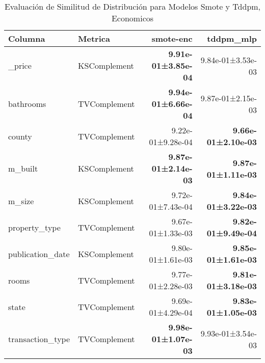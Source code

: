 \begin{table}[H]
\centering
\caption{Evaluación de Similitud de Distribución para Modelos Smote y Tddpm, Economicos}
\label{table-shape-economicos-b}
\begin{tabular}{|l|l|r|r|}
\hline
\rowcolor[gray]{0.8}
Columna & Metrica & smote-enc & tddpm\_mlp \\
\hline \_price & KSComplement & \bfseries 9.91e-01±3.85e-04 & 9.84e-01±3.53e-03 \\
\hline bathrooms & TVComplement & \bfseries 9.94e-01±6.66e-04 & 9.87e-01±2.15e-03 \\
\hline county & TVComplement & \cellcolor[rgb]{0.9, 0.54, 0.52} 9.22e-01±9.28e-04 & \bfseries \cellcolor[rgb]{0.9, 0.54, 0.52} 9.66e-01±2.10e-03 \\
\hline m\_built & KSComplement & \bfseries 9.87e-01±2.14e-03 & \bfseries 9.87e-01±1.11e-03 \\
\hline m\_size & KSComplement & 9.72e-01±7.43e-04 & \bfseries 9.84e-01±3.22e-03 \\
\hline property\_type & TVComplement & 9.67e-01±1.33e-03 & \bfseries 9.82e-01±9.49e-04 \\
\hline publication\_date & KSComplement & 9.80e-01±1.61e-03 & \bfseries 9.85e-01±1.61e-03 \\
\hline rooms & TVComplement & 9.77e-01±2.28e-03 & \bfseries 9.81e-01±3.18e-03 \\
\hline state & TVComplement & 9.69e-01±4.29e-04 & \bfseries 9.83e-01±1.05e-03 \\
\hline transaction\_type & TVComplement & \bfseries 9.98e-01±1.07e-03 & 9.93e-01±3.54e-03 \\
\hline
\end{tabular}
\end{table}
